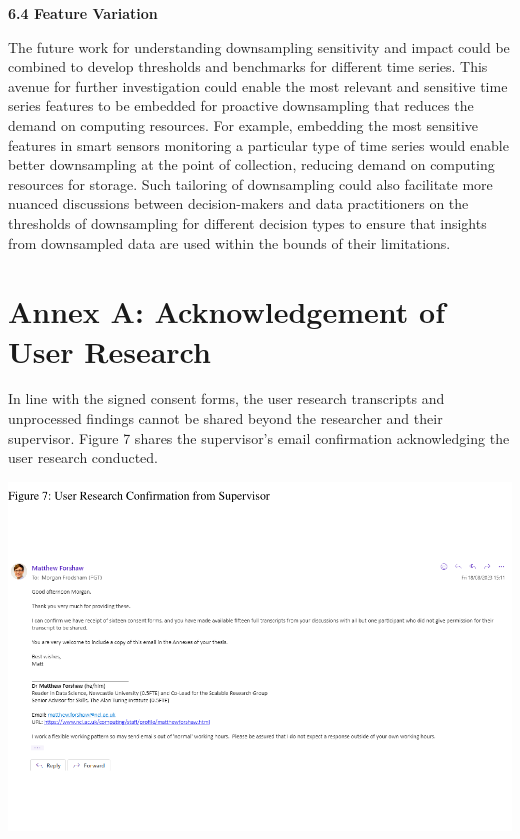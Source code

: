 \documentclass{article}
\begin{document}
\textbf{6.4 Feature Variation}

The future work for understanding downsampling sensitivity and impact
could be combined to develop thresholds and benchmarks for different
time series. This avenue for further investigation could enable the most
relevant and sensitive time series features to be embedded for proactive
downsampling that reduces the demand on computing resources. For
example, embedding the most sensitive features in smart sensors
monitoring a particular type of time series would enable better
downsampling at the point of collection, reducing demand on computing
resources for storage. Such tailoring of downsampling could also
facilitate more nuanced discussions between decision-makers and data
practitioners on the thresholds of downsampling for different decision
types to ensure that insights from downsampled data are used within the
bounds of their limitations.

\newpage

\hypertarget{annex-a-acknowledgement-of-user-research}{%
\section{Annex A: Acknowledgement of User
Research}\label{annex-a-acknowledgement-of-user-research}}

In line with the signed consent forms, the user research transcripts and
unprocessed findings cannot be shared beyond the researcher and their
supervisor. Figure 7 shares the supervisor's email confirmation
acknowledging the user research conducted.

\includegraphics[width=1\linewidth]{210431461_CSC8639_Dissertation_files/figure-latex/unnamed-chunk-3-1}
\newpage
\end{document}
